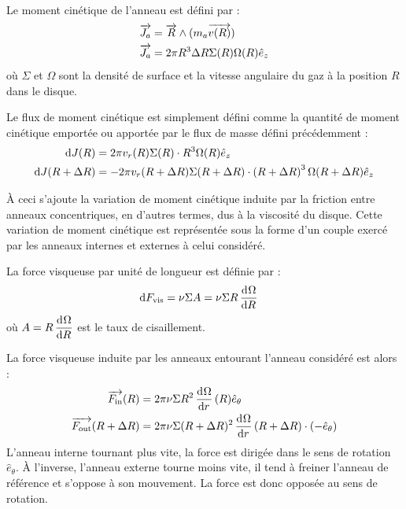 Le moment cinétique de l'anneau est défini par :
\begin{align}
\vect{J_a} &= \vect{R} \wedge (m_a\vect{v(R)}) \nonumber\\
\vect{J_a} &= 2\pi R^3 \Delta R \Sigma(R)\Omega(R)\hat{e}_z\label{eq:J_a}
\end{align}
où $\Sigma$ et $\Omega$ sont la densité de surface et la vitesse angulaire du gaz à la position $R$ dans le disque.

Le flux de moment cinétique est simplement défini comme la quantité de moment cinétique emportée ou apportée par le flux de masse défini précédemment  :
\begin{subequations}
\begin{align}
\operatorname{d \!} J(R) &= 2\pi v_r(R) \Sigma(R)\cdot R^3\Omega(R)\hat{e}_z\label{eq:dJ_in}\\
\operatorname{d \!} J(R+\Delta R) &= -2\pi v_r(R+\Delta R) \Sigma(R+\Delta R)\cdot \left(R+\Delta R\right)^3\Omega(R+\Delta R)\hat{e}_z\label{eq:dJ_out}
\end{align}\label{eq:dJ}
\end{subequations}

\bigskip

À ceci s'ajoute la variation de moment cinétique induite par la friction entre anneaux concentriques, en d'autres termes, dus à la viscosité du disque. Cette variation de moment cinétique est représentée sous la forme d'un couple exercé par les anneaux internes et externes à celui considéré. 

La force visqueuse par unité de longueur est définie par :
\begin{align}
\operatorname{d \!} F_\text{vis} &= \nu \Sigma A = \nu \Sigma R \mathinner{ \dfrac{\operatorname{d \!}{^{}}\Omega}{\operatorname{d \!}{{R}^{}}} }
\end{align}
où $A=R \mathinner{ \dfrac{\operatorname{d \!}{^{}}\Omega}{\operatorname{d \!}{{R}^{}}} }$ est le taux de cisaillement.

La force visqueuse induite par les anneaux entourant l'anneau considéré est alors : 
\begin{subequations}
\begin{align}
{\overrightarrow{F_\text{in}}}(R)&= 2\pi\nu \Sigma R^2 \mathinner{ \dfrac{\operatorname{d \!}{^{}}\Omega}{\operatorname{d \!}{{r}^{}}} }(R) \hat{e}_\theta\\
{\overrightarrow{F_\text{out}}}(R+\Delta R)&= 2\pi\nu \Sigma (R+\Delta R)^2 \mathinner{ \dfrac{\operatorname{d \!}{^{}}\Omega}{\operatorname{d \!}{{r}^{}}} }(R+\Delta R) \cdot (-\hat{e}_\theta)
\end{align}
\end{subequations}
L'anneau interne tournant plus vite, la force est dirigée dans le sens de rotation $\hat{e}_\theta$. À l'inverse, l'anneau externe tourne moins vite, il tend à freiner l'anneau de référence et s'oppose à son mouvement. La force est donc opposée au sens de rotation.

